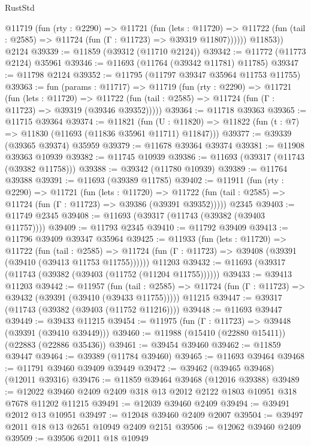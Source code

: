 \begin{lexlean}{RustStd}
\begin{coremodule}
          @11719
            (fun (rty : @2290) =>
            @11721
              (fun (lets : @11720) =>
              @11722 (fun (tail : @2585) => @11724 (fun (Γ : @11723) => @39319 @11807))))))
        @11853))
    @2124
@39339 := @11859 (@39312 (@11710 @2124))
@39342 := @11772 (@11773 @2124) @35961
@39346 := @11693 (@11764 (@39342 @11781) @11785)
@39347 := @11798 @2124
@39352 := @11795 (@11797 @39347 @35964 @11753 @11755)
@39363 := fun (params : @11717) =>
  @11719
    (fun (rty : @2290) =>
    @11721
      (fun (lets : @11720) =>
      @11722 (fun (tail : @2585) => @11724 (fun (Γ : @11723) => @39319 (@39346 @39352)))))
@39364 := @11718 @39363
@39365 := @11715 @39364
@39374 := @11821
    (fun (U : @11820) => @11822 (fun (t : @7) => @11830 (@11693 (@11836 @35961 @11711) @11847)))
@39377 := @39339 (@39365 @39374) @35959
@39379 := @11678 @39364 @39374
@39381 := @11908 @39363 @10939
@39382 := @11745 @10939
@39386 := @11693 (@39317 (@11743 (@39382 @11758)))
@39388 := @39342 (@11780 @10939)
@39389 := @11764 @39388
@39391 := @11693 (@39389 @11785)
@39402 := @11911
    (fun (rty : @2290) =>
    @11721
      (fun (lets : @11720) =>
      @11722 (fun (tail : @2585) => @11724 (fun (Γ : @11723) => @39386 (@39391 @39352)))))
    @2345
@39403 := @11749 @2345
@39408 := @11693 (@39317 (@11743 (@39382 (@39403 @11757))))
@39409 := @11793 @2345
@39410 := @11792 @39409
@39413 := @11796 @39409 @39347 @35964
@39425 := @11933
    (fun (lets : @11720) =>
    @11722
      (fun (tail : @2585) =>
      @11724 (fun (Γ : @11723) => @39408 (@39391 (@39410 (@39413 @11753 @11755))))))
    @11203
@39432 := @11693 (@39317 (@11743 (@39382 (@39403 (@11752 (@11204 @11755))))))
@39433 := @39413 @11203
@39442 := @11957
    (fun (tail : @2585) => @11724 (fun (Γ : @11723) => @39432 (@39391 (@39410 (@39433 @11755)))))
    @11215
@39447 := @39317 (@11743 (@39382 (@39403 (@11752 @11216))))
@39448 := @11693 @39447
@39449 := @39433 @11215
@39454 := @11975 (fun (Γ : @11723) => @39448 (@39391 (@39410 @39449)))
@39460 := @11988 (@15410 (@22880 @15411)) (@22883 (@22886 @35436))
@39461 := @39454 @39460
@39462 := @11859 @39447
@39464 := @39389 (@11784 @39460)
@39465 := @11693 @39464
@39468 := @11791 @39460 @39409 @39449
@39472 := @39462 (@39465 @39468) (@12011 @39316)
@39476 := @11859 @39464 @39468 (@12016 @39388)
@39489 := @12022 @39460 @2409 @2409 @318 @13 @2012 @2122 @1803 @10951 @318 @7678 @11202 @11215
@39491 := @12039 @39460 @2409
@39494 := @39491 @2012 @13 @10951
@39497 := @12048 @39460 @2409 @2007
@39504 := @39497 @2011 @18 @13 @2651 @10949 @2409 @2151
@39506 := @12062 @39460 @2409
@39509 := @39506 @2011 @18 @10949

\end{coremodule}
\end{lexlean}
